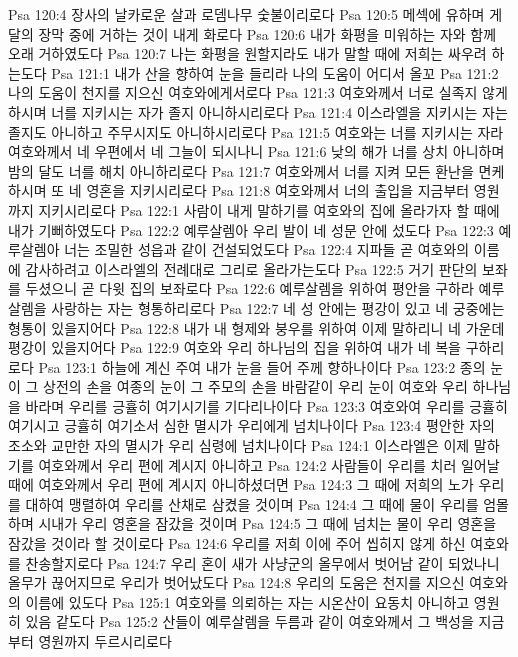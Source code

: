 Psa 120:4  장사의 날카로운 살과 로뎀나무 숯불이리로다
Psa 120:5  메섹에 유하며 게달의 장막 중에 거하는 것이 내게 화로다
Psa 120:6  내가 화평을 미워하는 자와 함께 오래 거하였도다
Psa 120:7  나는 화평을 원할지라도 내가 말할 때에 저희는 싸우려 하는도다
Psa 121:1  내가 산을 향하여 눈을 들리라 나의 도움이 어디서 올꼬
Psa 121:2  나의 도움이 천지를 지으신 여호와에게서로다
Psa 121:3  여호와께서 너로 실족지 않게 하시며 너를 지키시는 자가 졸지 아니하시리로다
Psa 121:4  이스라엘을 지키시는 자는 졸지도 아니하고 주무시지도 아니하시리로다
Psa 121:5  여호와는 너를 지키시는 자라 여호와께서 네 우편에서 네 그늘이 되시나니
Psa 121:6  낮의 해가 너를 상치 아니하며 밤의 달도 너를 해치 아니하리로다
Psa 121:7  여호와께서 너를 지켜 모든 환난을 면케 하시며 또 네 영혼을 지키시리로다
Psa 121:8  여호와께서 너의 출입을 지금부터 영원까지 지키시리로다
Psa 122:1  사람이 내게 말하기를 여호와의 집에 올라가자 할 때에 내가 기뻐하였도다
Psa 122:2  예루살렘아 우리 발이 네 성문 안에 섰도다
Psa 122:3  예루살렘아 너는 조밀한 성읍과 같이 건설되었도다
Psa 122:4  지파들 곧 여호와의 이름에 감사하려고 이스라엘의 전례대로 그리로 올라가는도다
Psa 122:5  거기 판단의 보좌를 두셨으니 곧 다윗 집의 보좌로다
Psa 122:6  예루살렘을 위하여 평안을 구하라 예루살렘을 사랑하는 자는 형통하리로다
Psa 122:7  네 성 안에는 평강이 있고 네 궁중에는 형통이 있을지어다
Psa 122:8  내가 내 형제와 붕우를 위하여 이제 말하리니 네 가운데 평강이 있을지어다
Psa 122:9  여호와 우리 하나님의 집을 위하여 내가 네 복을 구하리로다
Psa 123:1  하늘에 계신 주여 내가 눈을 들어 주께 향하나이다
Psa 123:2  종의 눈이 그 상전의 손을 여종의 눈이 그 주모의 손을 바람같이 우리 눈이 여호와 우리 하나님을 바라며 우리를 긍휼히 여기시기를 기다리나이다
Psa 123:3  여호와여 우리를 긍휼히 여기시고 긍휼히 여기소서 심한 멸시가 우리에게 넘치나이다
Psa 123:4  평안한 자의 조소와 교만한 자의 멸시가 우리 심령에 넘치나이다
Psa 124:1  이스라엘은 이제 말하기를 여호와께서 우리 편에 계시지 아니하고
Psa 124:2  사람들이 우리를 치러 일어날 때에 여호와께서 우리 편에 계시지 아니하셨더면
Psa 124:3  그 때에 저희의 노가 우리를 대하여 맹렬하여 우리를 산채로 삼켰을 것이며
Psa 124:4  그 때에 물이 우리를 엄몰하며 시내가 우리 영혼을 잠갔을 것이며
Psa 124:5  그 때에 넘치는 물이 우리 영혼을 잠갔을 것이라 할 것이로다
Psa 124:6  우리를 저희 이에 주어 씹히지 않게 하신 여호와를 찬송할지로다
Psa 124:7  우리 혼이 새가 사냥군의 올무에서 벗어남 같이 되었나니 올무가 끊어지므로 우리가 벗어났도다
Psa 124:8  우리의 도움은 천지를 지으신 여호와의 이름에 있도다
Psa 125:1  여호와를 의뢰하는 자는 시온산이 요동치 아니하고 영원히 있음 같도다
Psa 125:2  산들이 예루살렘을 두름과 같이 여호와께서 그 백성을 지금부터 영원까지 두르시리로다
